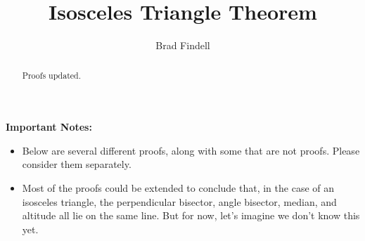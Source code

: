 \documentclass[nooutcomes]{ximera}
\title{Isosceles Triangle Theorem}
\author{Brad Findell}
\begin{document}
\begin{abstract}
Proofs updated. 
\end{abstract}
\maketitle

%
%

\textbf{Important Notes:}
\begin{itemize}
\item Below are several different proofs, along with some that are not proofs.  Please consider them separately.
\item Most of the proofs could be extended to conclude that, in the case of an isosceles triangle, the perpendicular bisector, angle bisector, median, and altitude all lie on the same line.  But for now, let's imagine we don't know this yet.
\end{itemize}
\end{document}
